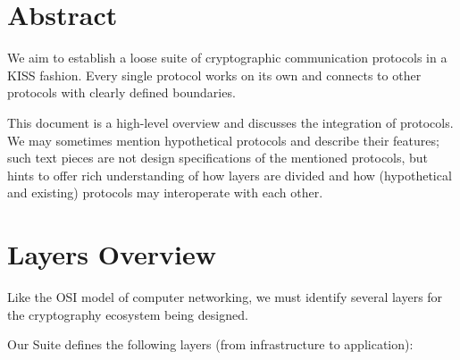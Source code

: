 \documentclass[a4paper,11pt]{article}
\begin{document}
\fulldoctitle


\section*{Abstract}

We aim to establish a loose suite of cryptographic communication protocols in a KISS fashion.
Every single protocol works on its own and connects to other protocols with clearly defined boundaries.

This document is a high-level overview and discusses the integration of protocols.
We may sometimes mention hypothetical protocols and describe their features;
such text pieces are not design specifications of the mentioned protocols,
but hints to offer rich understanding of how layers are divided and how
(hypothetical and existing) protocols may interoperate with each other.

\tableofcontents\clearpage




\section{Layers Overview}

Like the OSI model of computer networking, we must identify several layers for the cryptography ecosystem being designed.

Our Suite defines the following layers (from infrastructure to application):
\end{document}
